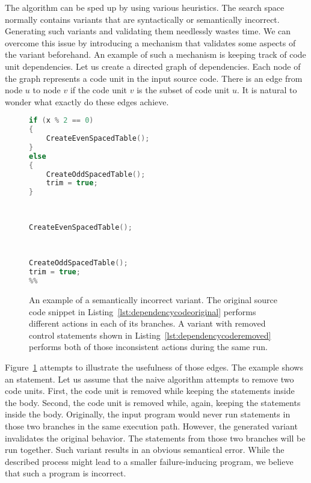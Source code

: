The algorithm can be sped up by using various heuristics. 
The search space normally contains variants that are syntactically or 
semantically incorrect. 
Generating such variants and validating them needlessly wastes time. 
We can overcome this issue by introducing a mechanism that validates some 
aspects of the variant beforehand. 
An example of such a mechanism is keeping track of code unit dependencies. 
Let us create a directed graph of dependencies. 
Each node of the graph represents a code unit in the input source code. 
There is an edge from node $u$ to node $v$ if the code unit $v$ is 
the subset of code unit $u$. 
It is natural to wonder what exactly do these edges achieve. 

\begin{figure}[H]
\begin{minipage}{0.46\textwidth}
\begin{lstlisting}[basicstyle=\small, caption=An if - else statement.,
  language=C++, label={lst:dependencycodeoriginal}]
if (x % 2 == 0)
{
	CreateEvenSpacedTable();
}
else
{
	CreateOddSpacedTable();
	trim = true;
}
\end{lstlisting}
\end{minipage}
\hfill
\begin{minipage}{.45\textwidth}
\begin{lstlisting}[basicstyle=\small, caption=An invalid variant 
of~\ref{lst:dependencycodeoriginal}., language=C++, numbers=right,
  escapechar=\%, label={lst:dependencycoderemoved}]
	
	
CreateEvenSpacedTable();
	
	
	
CreateOddSpacedTable();
trim = true;
%%

\end{lstlisting}
\end{minipage}
\caption{An example of a semantically incorrect variant. The original source
code snippet in Listing~\ref{lst:dependencycodeoriginal} performs different 
actions in each of its branches. A variant with removed control statements 
shown in Listing~\ref{lst:dependencycoderemoved} performs both of those 
inconsistent actions during the same run.}
\label{lst:dependencycode}
\end{figure}

Figure~\ref{lst:dependencycode} attempts to illustrate the usefulness 
of those edges. 
The example shows an  statement. 
Let us assume that the naive algorithm attempts to remove two code units. 
First, the code unit  is removed while keeping the statements 
inside the body. 
Second, the code unit  is removed while, again, keeping 
the statements inside the body. 
Originally, the input program would never run statements in those two 
branches in the same execution path. 
However, the generated variant invalidates the original behavior. 
The statements from those two branches will be run together. 
Such variant results in an obvious semantical error. 
While the described process might lead to a smaller failure-inducing program, 
we believe that such a program is incorrect. 

